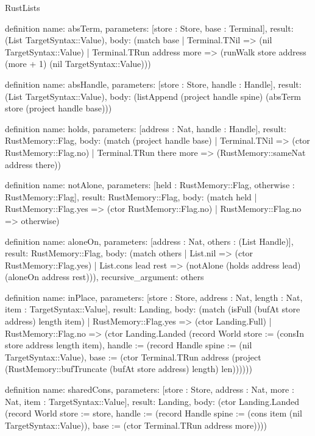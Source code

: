 \begin{lexlean}{RustLists}
\begin{semanticmodule}
definition{
  name: absTerm,
  parameters: [store : Store, base : Terminal],
  result: (List TargetSyntax::Value),
  body: (match base
    | Terminal.TNil => (nil TargetSyntax::Value)
    | Terminal.TRun address more => (runWalk store address (more + 1) (nil TargetSyntax::Value)))
}

definition{
  name: absHandle,
  parameters: [store : Store, handle : Handle],
  result: (List TargetSyntax::Value),
  body: (listAppend (project handle spine) (absTerm store (project handle base)))
}

definition{
  name: holds,
  parameters: [address : Nat, handle : Handle],
  result: RustMemory::Flag,
  body: (match (project handle base)
    | Terminal.TNil => (ctor RustMemory::Flag.no)
    | Terminal.TRun there more => (RustMemory::sameNat address there))
}

definition{
  name: notAlone,
  parameters: [held : RustMemory::Flag, otherwise : RustMemory::Flag],
  result: RustMemory::Flag,
  body: (match held
    | RustMemory::Flag.yes => (ctor RustMemory::Flag.no)
    | RustMemory::Flag.no => otherwise)
}

definition{
  name: aloneOn,
  parameters: [address : Nat, others : (List Handle)],
  result: RustMemory::Flag,
  body: (match others
    | List.nil => (ctor RustMemory::Flag.yes)
    | List.cons lead rest => (notAlone (holds address lead) (aloneOn address rest))),
  recursive_argument: others
}

definition{
  name: inPlace,
  parameters: [store : Store, address : Nat, length : Nat, item : TargetSyntax::Value],
  result: Landing,
  body: (match (isFull (bufAt store address) length item)
    | RustMemory::Flag.yes => (ctor Landing.Full)
    | RustMemory::Flag.no => (ctor Landing.Landed (record World {store := (consIn store address length item), handle := (record Handle {spine := (nil TargetSyntax::Value), base := (ctor Terminal.TRun address (project (RustMemory::bufTruncate (bufAt store address) length) len))})})))
}

definition{
  name: sharedCons,
  parameters: [store : Store, address : Nat, more : Nat, item : TargetSyntax::Value],
  result: Landing,
  body: (ctor Landing.Landed (record World {store := store, handle := (record Handle {spine := (cons item (nil TargetSyntax::Value)), base := (ctor Terminal.TRun address more)})}))
}


\end{semanticmodule}
\end{lexlean}
